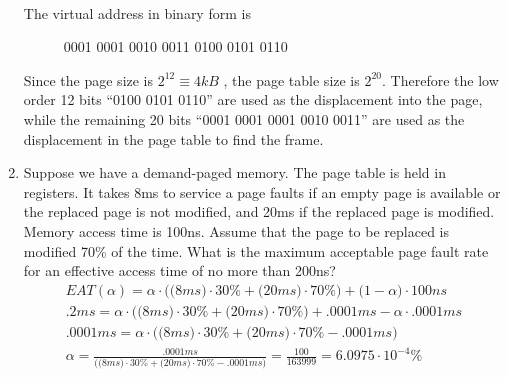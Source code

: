 \documentclass{article}
\newcommand{\answercolor}{Bittersweet}
\newcommand{\answer}[1]{{\\\color{\answercolor}\footnotesize\itshape{#1}}}
\begin{document}
\begin{enumerate}
        \answer{
        The virtual address in binary form is
        \begin{figure}
            \centering
            0001 0001 0001 0010 0011 0100 0101 0110
        \end{figure}
        Since the page size is $2^{12} \equiv 4kB$  , the page table size is $2^{20}$. Therefore the low order 12 bits “0100 0101 0110” are used as the displacement into the page, while the remaining 20 bits “0001 0001 0001 0010 0011” are used as the displacement in the page table to find the frame.
        }
		\item Suppose we have a demand-paged memory. The page table is held in registers. It takes 8ms to service a page faults if an empty page is available or the replaced page is not modified, and 20ms if the replaced page is modified. Memory access time is 100ns. Assume that the page to be replaced is modified 70\% of the time. What is the maximum acceptable page fault rate for an effective access time of no more than 200ns?
        \answer{
            \begin{equation*}
                \begin{gathered}
                    EAT(\alpha)=\alpha\cdot\bigg(\big(8ms\big)\cdot30\%+\big(20ms\big)\cdot70\%\bigg)+\big(1-\alpha\big)\cdot100ns\\
                    .2ms = \alpha\cdot\bigg(\big(8ms\big)\cdot30\%+\big(20ms\big)\cdot70\%\bigg)+.0001ms-\alpha\cdot.0001ms\\
                    .0001ms = \alpha\cdot\bigg(\big(8ms\big)\cdot30\%+\big(20ms\big)\cdot70\%-.0001ms\bigg)\\
                    \alpha = \frac{.0001ms}{\bigg(\big(8ms\big)\cdot30\%+\big(20ms\big)\cdot70\%-.0001ms\bigg)}=\frac{100}{163999}=6.0975\cdot10^{-4}\%\\
                \end{gathered}
            \end{equation*}
        }


\end{enumerate}
\end{document}
